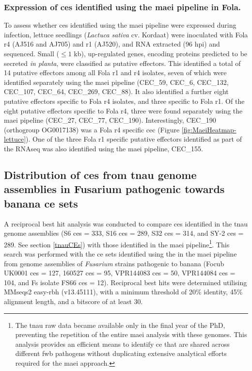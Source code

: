 \subsubsection{Expression of \aclp{ce} identified using the \ac{maei} pipeline in \acl{Fola}.}

To assess whether \acp{ce} identified using the \ac{maei} pipeline were expressed during infection, lettuce seedlings (\textit{Lactuca sativa} cv. Kordaat) were inoculated with \ac{Fola} \ac{r4} (AJ516 and AJ705) and \ac{r1} (AJ520), and RNA extracted (96 \ac{hpi}) and sequenced. Small ($ \leq1$ kb), up-regulated genes, encoding proteins predicted to be secreted \textit{in planta}, were classified as putative effectors. This identified a total of 14 putative effectors among all  \ac{Fola} \ac{r1} and \ac{r4} isolates, seven of which  were identified separately using the \ac{maei} pipeline (CEC\_59, CEC\_6, CEC\_132, CEC\_107, CEC\_64, CEC\_269, CEC\_88). It also  identified a further eight putative effectors specific to \ac{Fola} \ac{r4} isolates, and three specific to \ac{Fola} \ac{r1}. Of the eight putative effectors specific to \ac{Fola} \ac{r4}, three were found separately using the \ac{maei} pipeline (CEC\_27, CEC\_77, CEC\_190). Interestingly, CEC\_190 (orthogroup OG0017138) was a \ac{Fola} \ac{r4} specific \ac{cec} (Figure \ref{fig:MaeiHeatmap-lettuce}). One of the three \ac{Fola} \ac{r1} specific putative effectors identified as part of the RNAseq was also identified using the \ac{maei} pipeline, CEC\_155. 

\subsection{Distribution of \aclp{ce} from \ac{tnau} genome assemblies in Fusarium pathogenic towards banana \ac{ce} sets}
\label{sec:Chap3RNASeq}

A reciprocal best hit analysis was conducted to compare \acp{ce} identified in the \ac{tnau} genome assemblies (S6 \acp{ce} = 333, S16  \acp{ce} = 289, S32 \acp{ce} = 314, and SY-2 \acp{ce} = 289. See section \ref{tnauCEs}) with those identified in the \ac{maei} pipeline\footnote{The \ac{tnau} raw data became available only in the final year of the PhD, preventing the repetition of the entire \ac{maei} analysis with these genomes. This analysis provides an efficient means to identify \ac{ce} that are shared across different \ac{fwb} pathogens without duplicating extensive analytical efforts required for the \ac{maei} approach.}. This search was performed with the \ac{ce} sets identified using the in the \ac{maei} pipeline from genome assemblies of \textit{Fusarium} strains pathogenic to banana (\ac{Focub} UK0001 \acp{ce} = 127, 160527 \acp{ce} = 95, VPR144083 \acp{ce} = 50, VPR144084 \acp{ce} = 104, and \ac{Fs} isolate FS66 \acp{ce} = 12). Reciprocal best hits were determined utilising MMseqs2 easy-rbh (v13.45111), with a minimum threshold of 20\% identity, 45\% alignment length, and a bitscore of at least 30. 

